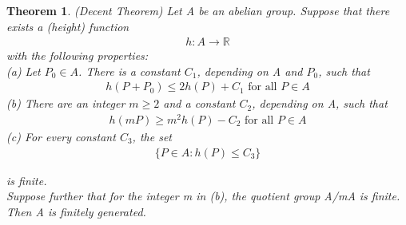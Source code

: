 \documentclass[12pt]{article}
\newcommand{\<}{\langle}
\renewcommand{\>}{\rangle}
\numberwithin{equation}{section}
\theoremstyle{plain}
\newtheorem{thm}{Theorem}[section]
\theoremstyle{definition}
\begin{document}
\begin{thm} (Decent Theorem) 
    Let A be an abelian group. Suppose that there exists a (height) function
    \begin{align*}
        h:A \xrightarrow{} \mathbb{R}
    \end{align*}
    with the following properties: \\
    (a) Let \(P_0 \in A\). There is a constant \(C_1\), depending on A and \(P_0\), such that
        \begin{gather*}
            h(P+ P_0) \leq 2h(P) + C_1 \text{  for all \(P \in A\)}
        \end{gather*}
    (b) There are an integer \(m \geq 2\) and a constant \(C_2\), depending on A, such that
        \begin{gather*}
            h(mP) \geq m^2 h(P) - C_2 \text{  for all \(P \in A\)}
        \end{gather*}
    (c) For every constant \(C_3\), the set
        \begin{gather*}
            \{P \in A : h(P) \leq C_3\}
        \end{gather*} 
            \par is finite. \\
    Suppose further that for the integer m in (b), the quotient group A/mA is finite. Then A is finitely generated.
\end{thm}
\end{document}
